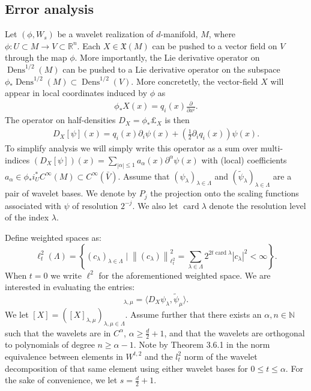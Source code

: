 \documentclass[12pt]{amsart}
\newcommand{\norm}[1]{\ensuremath{\left\| #1 \right\| }}
\newcommand{\abs}[1]{\ensuremath{ | #1 | }}
\DeclareMathOperator{\Dens}{Dens}
\DeclareMathOperator{\card}{card}
\begin{document}
\subsection{Error analysis}
\label{sec:error}
Let $(\phi,W_s)$ be a wavelet realization of $d$-manifold, $M$,
where $\phi: U \subset M \to V \subset \mathbb{R}^n$.
Each $X \in \mathfrak{X}(M)$ can be pushed to a vector field on $V$ through the map $\phi$.
More importantly, the Lie derivative operator on $\Dens^{1/2}(M)$ can be pushed to a Lie derivative operator on the subspace $\phi_* \Dens^{1/2}(M) \subset \Dens^{1/2}(V)$.
More concretetly, the vector-field $X$ will appear in local coordinates induced by $\phi$ as
\begin{align*}
  \phi_*X(x) = q_i(x) \frac{\partial}{\partial x^i}.
\end{align*}
The operator on half-densities $D_X = \phi_* \pounds_X$ is then
\begin{align*}
  D_X[\psi](x) =  q_i(x) \partial_i \psi(x) + \left( \frac{1}{2} \partial_i q_i(x) \right) \psi(x).
\end{align*}
 To simplify analysis we will simply write this operator as a sum over multi-indices $(D_X [\psi] )(x) = \sum_{|\alpha|\leq 1} a_\alpha(x) \partial^\alpha \psi(x)$ with (local) coefficients $a_\alpha \in \phi_*i_{U}^*C^{\infty}(M) \subset C^{\infty}(\bar{V})$. Assume that $(\psi_\lambda)_{\lambda \in \Lambda}$ and $(\tilde{\psi}_\lambda)_{\lambda \in \Lambda}$ are a pair of wavelet bases. We denote by $P_j$ the projection onto the scaling functions associated with $\psi$ of resolution $2^{-j}$. We also let $\card{\lambda}$ denote the resolution level of the index $\lambda$. 

Define weighted spaces as:
\begin{equation}
	\ell_t^2(\Lambda) = \left\{ (c_\lambda)_{\lambda \in \Lambda}  \mid \norm{(c_\lambda)}_{\ell^2_t}^2 = \sum_{\lambda \in \Lambda} 2^{2t\card{\lambda}}\abs{c_\lambda}^2 < \infty  \right\}.
\end{equation}
When $t = 0$ we write $\ell^2$ for the aforementioned weighted space. We are interested in evaluating the entries:
\begin{equation}
	[X]_{\lambda,\mu} = \langle D_X \psi_\lambda, \tilde{\psi}_\mu \rangle.
\end{equation}
We let $[X]=([X]_{\lambda,\mu})_{\lambda,\mu \in \Lambda}$. Assume further that there exists an $\alpha,n \in \mathbb{N}$ such that the wavelets are in $C^{\alpha}$, $\alpha \geq \frac{d}{2} + 1$, and that the wavelets are orthogonal to polynomials of degree $n \geq \alpha - 1$.  Note by Theorem 3.6.1 in \cite{Cohen2003} the norm equivalence between elements in $W^{t,2}$ and the $l_t^2$ norm of the wavelet decomposition of that same element using either wavelet bases for $0\leq t \leq \alpha$. For the sake of convenience, we let $s = \frac{d}{2} + 1$. 
\end{document}
